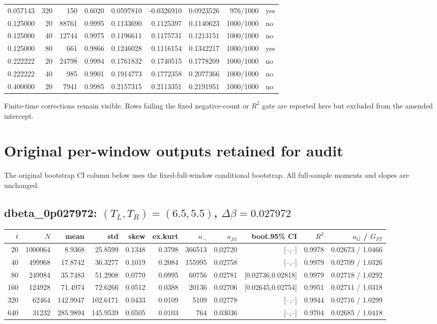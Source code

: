 \documentclass[10pt]{article}
\begin{document}
\begin{longtable}{lrrrrrrrl}
0.057143 & 320 & 150 & 0.6020 & 0.0597810 & -0.0326910 & 0.0923526 & 976/1000 & yes \\
0.125000 & 20 & 88761 & 0.9995 & 0.1133690 & 0.1125397 & 0.1140623 & 1000/1000 & no \\
0.125000 & 40 & 12744 & 0.9975 & 0.1196611 & 0.1175731 & 0.1213151 & 1000/1000 & no \\
0.125000 & 80 & 661 & 0.9866 & 0.1246028 & 0.1116154 & 0.1342217 & 1000/1000 & yes \\
0.222222 & 20 & 24798 & 0.9994 & 0.1761832 & 0.1740515 & 0.1778209 & 1000/1000 & no \\
0.222222 & 40 & 985 & 0.9901 & 0.1914773 & 0.1772358 & 0.2077366 & 1000/1000 & no \\
0.400000 & 20 & 7941 & 0.9985 & 0.2157315 & 0.2113351 & 0.2191951 & 1000/1000 & no \\
\bottomrule\end{longtable}\normalsize
Finite-time corrections remain visible.  Rows failing the fixed negative-count or $R^2$ gate are reported here but excluded from the amended intercept.
\section*{Original per-window outputs retained for audit}
The original bootstrap CI column below uses the fixed-full-window conditional bootstrap.  All full-sample moments and slopes are unchanged.
\subsection*{dbeta\_0p027972: $(T_L,T_R)=(6.5,5.5)$, $\Delta\beta=0.027972$}
\scriptsize\begin{longtable}{rrrrrrrrrrr}
\toprule $t$ & $N$ & mean & std & skew & ex.kurt & $n_-$ & $a_{fit}$ & boot.95\% CI & $R^2$ & $a_G$ / $G_{FT}$ \\
\midrule\endhead
20 & 1000064 & 8.9368 & 25.8599 & 0.1348 & 0.3798 & 366513 & 0.02720 & [--,--] & 0.9978 & 0.02673 / 1.0466 \\
40 & 499968 & 17.8742 & 36.3277 & 0.1019 & 0.2084 & 155995 & 0.02758 & [--,--] & 0.9979 & 0.02709 / 1.0326 \\
80 & 249984 & 35.7483 & 51.2908 & 0.0770 & 0.0995 & 60756 & 0.02781 & [0.02736,0.02818] & 0.9979 & 0.02718 / 1.0292 \\
160 & 124928 & 71.4974 & 72.6266 & 0.0512 & 0.0388 & 20136 & 0.02706 & [0.02645,0.02754] & 0.9951 & 0.02711 / 1.0318 \\
320 & 62464 & 142.9947 & 102.6171 & 0.0433 & 0.0109 & 5109 & 0.02778 & [--,--] & 0.9944 & 0.02716 / 1.0299 \\
640 & 31232 & 285.9894 & 145.9539 & 0.0505 & 0.0103 & 764 & 0.03036 & [--,--] & 0.9704 & 0.02685 / 1.0418 \\
\bottomrule\end{longtable}\normalsize
\end{document}

